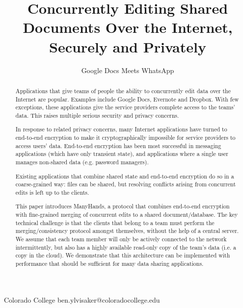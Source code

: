 \documentclass[pldi-cameraready,10pt]{sigplanconf-pldi16}
\begin{document}
\newcommand{\subscr}[2]{{$\textrm{#1}_{#2}$}}
\newcommand{\LoginSalt}[1]{{$\textrm{LoginSalt}_{#1}$}}
\newcommand{\LoginKey}[1]{{$\textrm{LoginKey}_{#1}$}}
\newcommand{\MainKey}[1]{{$\textrm{MainKey}_{#1}$}}

\setlength{\pdfpageheight}{\paperheight}
\setlength{\pdfpagewidth}{\paperwidth}



\title{Concurrently Editing Shared Documents Over the Internet, Securely and Privately}
\subtitle{Google Docs Meets WhatsApp}

           {Colorado College}
           {ben.ylvisaker@coloradocollege.edu}

\maketitle

\begin{abstract}

Applications that give teams of people the ability to concurrently edit data over the Internet are popular.
Examples include Google Docs, Evernote and Dropbox.
With few exceptions, these applications give the service providers complete access to the teams' data.
This raises multiple serious security and privacy concerns.

In response to related privacy concerns, many Internet applications have turned to end-to-end encryption to make it cryptographically impossible for service providers to access users' data.
End-to-end encryption has been most successful in messaging applications (which have only transient state), and applications where a single user manages non-shared data (e.g. password managers).

Existing applications that combine shared state and end-to-end encryption do so in a coarse-grained way: files can be shared, but resolving conflicts arising from concurrent edits is left up to the clients.

This paper introduces ManyHands, a protocol that combines end-to-end encryption with fine-grained merging of concurrent edits to a shared document/database.
The key technical challenge is that the clients that belong to a team must perform the merging/consistency protocol amongst themselves, without the help of a central server.
We assume that each team member will only be actively connected to the network intermittently, but also has a highly available read-only copy of the team's data (i.e. a copy in the cloud).
We demonstrate that this architecture can be implemented with performance that should be sufficient for many data sharing applications.

\end{abstract}
\end{document}
